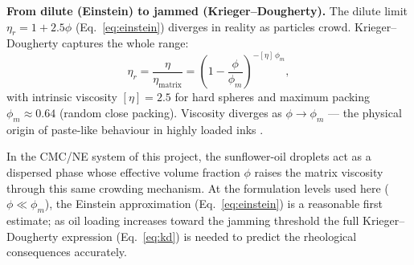 \documentclass[11pt,a4paper]{article}
\begin{document}
\begin{goingdeeperbox}
\textbf{From dilute (Einstein) to jammed (Krieger--Dougherty).} The
dilute limit $\eta_r=1+2.5\phi$ (Eq.~\ref{eq:einstein}) diverges in
reality as particles crowd.  Krieger--Dougherty captures the whole range:
\begin{equation}
\eta_r=\frac{\eta}{\eta_\mathrm{matrix}}
=\left(1-\frac{\phi}{\phi_m}\right)^{-[\eta]\,\phi_m},
\label{eq:kd}
\end{equation}
with intrinsic viscosity $[\eta]=2.5$ for hard spheres and maximum
packing $\phi_m\approx0.64$ (random close packing). Viscosity diverges as
$\phi\to\phi_m$ --- the physical origin of paste-like behaviour in highly
loaded inks \citep{KriegerDougherty1959}.

\medskip
In the CMC/NE system of this project, the sunflower-oil droplets act as
a dispersed phase whose effective volume fraction $\phi$ raises the matrix
viscosity through this same crowding mechanism.  At the formulation levels
used here ($\phi\ll\phi_m$), the Einstein approximation
(Eq.~\ref{eq:einstein}) is a reasonable first estimate; as oil loading
increases toward the jamming threshold the full Krieger--Dougherty
expression (Eq.~\ref{eq:kd}) is needed to predict the rheological
consequences accurately.
\end{goingdeeperbox}
\end{document}
